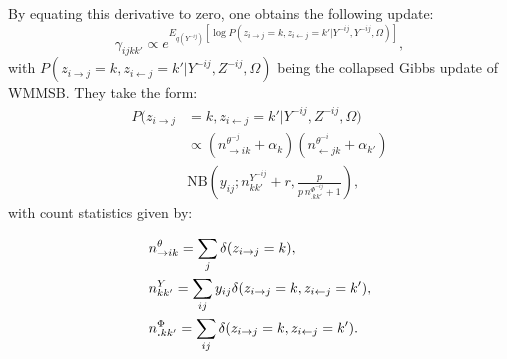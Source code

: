 %
By equating this derivative to zero, one obtains the following update:
\begin{equation} \label{eq:maximization}
\gamma_{ijkk'} \propto e^{E_{q({Y}^{-ij})} [\log P(z_{i\rightarrow j}=k, z_{i\leftarrow j}=k' | {Y}^{-ij}, {Y}^{-ij}, \Omega)]},
\end{equation}
%
with  $P(z_{i\rightarrow j}=k, z_{i\leftarrow j}=k' | {Y}^{-ij}, {Z}^{-ij}, \Omega)$ being the collapsed Gibbs update of WMMSB. They take the form:
%
\begin{align*}
P(z_{i\rightarrow j} & = k, z_{i\leftarrow j}=k' |{Y}^{-ij}, {Z}^{-ij}, \Omega) \\
& \propto (n_{\rightarrow ik}^{\theta^{-j}} + \alpha_k) (n_{\leftarrow jk}^{\theta^{-i}} + \alpha_{k'}) \\
& \mathrm{NB}\left(y_{ij}; n^{{Y}^{-ij}}_{kk'} + r, \frac{p}{p\,n^{\Phi^{-ij}}_{\bm{.}kk'} + 1} \right),
\end{align*}
%
with count statistics given by:


\begin{align*}                                                                                                                                        
&n^{\theta}_{\rightarrow ik} = \sum_j \delta(z_{i\rightarrow j}=k), \\
&n^{{Y}}_{kk'} = \sum_{ij} y_{ij}\delta(z_{i\rightarrow j}=k, z_{i\leftarrow j}=k'), \\
&n^{\Phi}_{\bm{.}kk'} = \sum_{ij} \delta( z_{i\rightarrow j}=k, z_{i\leftarrow j}=k').
\end{align*}   


